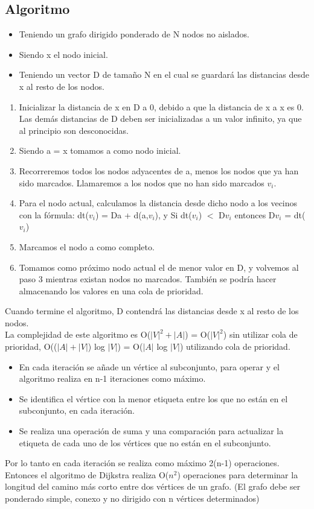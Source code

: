 \subsection{Algoritmo \cite{dijkstrabib}}\label{Explicacion-algoritmo-Dijkstra}
\begin{itemize}
\item
Teniendo un grafo dirigido ponderado de N nodos no aislados.
\item 
Siendo x el nodo inicial.
\item 
Teniendo un vector D de tamaño N en el cual se guardará las distancias desde x al resto de los nodos.
\end{itemize}

\begin{enumerate}
\item
Inicializar la distancia de x en D a 0, debido a que la distancia de x a x es 0. Las demás distancias de D deben ser inicializadas a un valor infinito, ya que al principio son desconocidas.
\item
Siendo a = x tomamos a como nodo inicial.
\item
Recorreremos todos los nodos adyacentes de a, menos los nodos que ya han sido marcados. Llamaremos a los nodos que no han sido marcados $v_i$.
\item
Para el nodo actual, calculamos la distancia desde dicho nodo a los vecinos con la fórmula: dt($v_i$) = Da + d(a,$v_i$), y Si dt($v_i$) $<$ D$v_i$ entonces D$v_i$ = dt($v_i$)
\item
Marcamos el nodo a como completo.
\item
Tomamos como próximo nodo actual el de menor valor en D, y volvemos al paso 3 mientras existan nodos no marcados. También se podría hacer almacenando los valores en una cola de prioridad.

\end{enumerate}

Cuando termine el algoritmo, D contendrá las distancias desde x al resto de los nodos.
\\
La complejidad de este algoritmo es O($|V|^2+|A|$) = O($|V|^2$) sin utilizar cola de prioridad, O(($|A|+|V|$) log $|V|$) = O($|A|$ log $|V|$) utilizando cola de prioridad.

\begin{itemize}
\item
En cada iteración se añade un vértice al subconjunto, para operar y el algoritmo realiza en n-1 iteraciones como máximo.
\item
Se identifica el vértice con la menor etiqueta entre los que no están en el subconjunto, en cada iteración.
\item
Se realiza una operación de suma y una comparación para actualizar la etiqueta de cada uno de los vértices que no están en el subconjunto.

\end{itemize}

Por lo tanto en cada iteración se realiza como máximo 2(n-1) operaciones. Entonces el algoritmo de Dijkstra realiza O($n^2$) operaciones para determinar la longitud del camino más corto entre dos vértices de un grafo. (El grafo debe ser ponderado simple, conexo y no dirigido con n vértices determinados)


